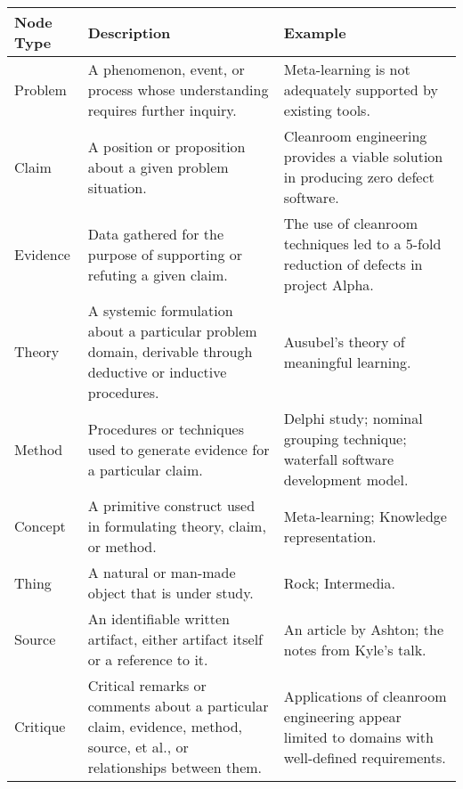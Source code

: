 {\newpage
\clearpage
\samepage \begin{figure*}%
[htb]
  \begin{center}
    

    \begin{tabular} {|l|p{2.5in}|p{2.5in}|} \hline   
      {\bf Node Type} & {\bf Description} & {\bf Example} \\  \hline \hline
      
      Problem & A phenomenon, event, or process whose understanding
      requires further inquiry. & Meta-learning is not adequately
      supported by existing tools. \\  \hline
      
      Claim & A position or proposition about a given problem
      situation.  & Cleanroom engineering provides a viable solution
      in producing zero defect software. \\  \hline
      
      Evidence & Data gathered for the purpose of supporting or
      refuting a given claim. & The use of cleanroom techniques led
      to a 5-fold reduction of defects in project Alpha. \\ 
      \hline 

      Theory & A systemic formulation about a particular problem
      domain, derivable through deductive or inductive procedures. &
      Ausubel's theory of meaningful learning. \\  \hline
      
      Method & Procedures or techniques used to generate evidence for
      a particular claim. & Delphi study; nominal grouping technique;
      waterfall software development model. \\  \hline
      
      Concept & A primitive construct used in formulating theory,
      claim, or method. & Meta-learning; Knowledge representation.
      \\  \hline
      
      Thing & A natural or man-made object that is under study.  &
      Rock; Intermedia.  \\  \hline
      
      Source & An identifiable written artifact, either artifact
      itself or a reference to it. & An
      article by Ashton; the notes from Kyle's talk. \\  \hline \hline
      
      Critique & Critical remarks or comments about a particular
      claim, evidence, method, source, et al., or relationships
      between them. & Applications of cleanroom
      engineering appear limited to domains with well-defined requirements.
      \\  \hline
      

\end{tabular}
\end{center}
\end{figure*}}
